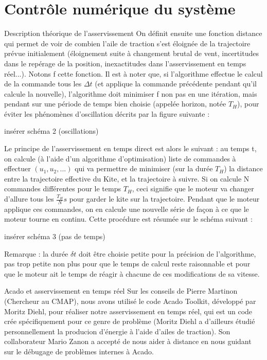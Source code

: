 \documentclass[a4paper,twoside,12pt]{article}
\newcounter{partie}
\newcounter{sous-partie}
\newenvironment{partie}[1]
{
\section{#1}
}
{

}
\newenvironment{sous-partie}[1]
{
\subsection{#1}
}
{

}
\begin{document}
\begin{partie}{Contrôle numérique du système}
\begin{sous-partie}{Description théorique de l'asservissement}
On définit ensuite une fonction distance qui permet de voir de combien l'aile de traction s'est éloignée de la trajectoire prévue initialement (éloignement suite à changement brutal de vent, incertitudes dans le repérage de la position, inexactitudes dans l'asservissement en temps réel...). Notons f cette fonction. Il est à noter que, si l'algorithme effectue le calcul de la commande tous les $\Delta t$ (et applique la commande précédente pendant qu'il calcule la nouvelle), l'algorithme doit minimiser f non pas en une itération, mais pendant sur  une période de temps bien choisie (appelée horizon, notée $T_H$), pour éviter les phénomènes d'oscillation décrits par la figure suivante : 
\newline
\begin{Huge}
insérer schéma 2 (oscillations)
\end{Huge}
\newline
Le principe de l'asservissement en temps direct est alors le suivant : au temps t, on calcule (à l'aide d'un algorithme d'optimisation) liste de commandes à effectuer $(u_1,u_2,...)$ qui va permettre de minimiser (sur la durée $T_H$) la distance entre la trajectoire effective du Kite, et la trajectoire à suivre. Si on calcule N commandes différentes pour le temps $T_H$, ceci signifie que le moteur va changer d'allure tous les $\frac{T_H}{N}s$ pour garder le kite sur la trajectoire. Pendant que le moteur applique ces commandes, on en calcule une nouvelle série de façon à ce que le moteur tourne en continu. Cette procédure est résumée sur le schéma suivant : 
\newline
\begin{huge}
insérer schéma 3 (pas de temps)
\end{huge}
Remarque : la durée $\delta t$ doit être choisie petite pour la précision de l'algorithme, pas trop petite non plus pour que le temps de calcul reste raisonnable et pour que le moteur ait le temps de réagir à chacune de ces modifications de sa vitesse.
\end{sous-partie}

\begin{sous-partie}{Acado et asservissement en temps réel}
Sur les conseils de Pierre Martinon (Chercheur au CMAP), nous avons utilisé le code Acado Toolkit, développé par Moritz Diehl, pour réaliser notre asservissement en temps réel, qui est un code crée spécifiquement pour ce genre de problème (Moritz Diehl a d'ailleurs étudié personnellement la producion d'énergie à l'aide d'ailes de traction).
Son collaborateur Mario Zanon a accepté de nous aider à distance en nous guidant sur le débugage de problèmes internes à Acado.


\end{sous-partie}
\end{partie}
\end{document}
